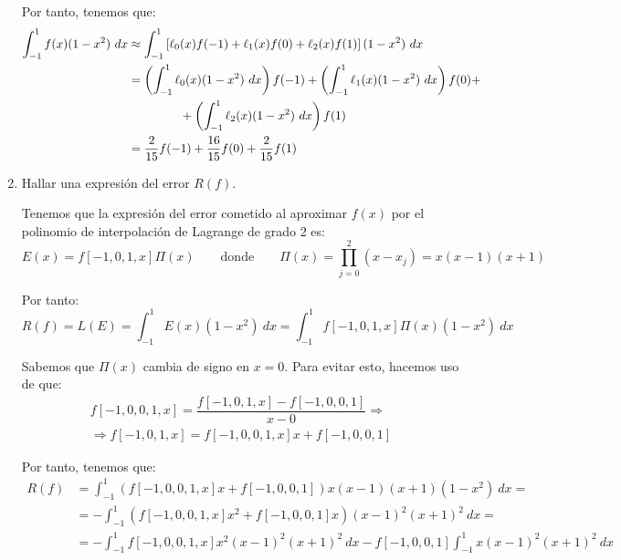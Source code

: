 \begin{ejercicio}
\begin{enumerate}
        Por tanto, tenemos que:
        \begin{align*}
            \int_{-1}^1f(x)(1-x^2)\ dx &\approx \int_{-1}^1\left[\ell_0(x)f(-1)+\ell_1(x)f(0)+\ell_2(x)f(1)\right](1-x^2)\ dx\\
            &= \left(\int_{-1}^1\ell_0(x)(1-x^2)\ dx\right)f(-1)+\left(\int_{-1}^1\ell_1(x)(1-x^2)\ dx\right)f(0)+\\&\hspace{1.5cm}+\left(\int_{-1}^1\ell_2(x)(1-x^2)\ dx\right)f(1)\\
            &= \dfrac{2}{15}f(-1)+\dfrac{16}{15}f(0)+\dfrac{2}{15}f(1)
        \end{align*}
        \item Hallar una expresión del error $R(f)$.
        
        Tenemos que la expresión del error cometido al aproximar $f(x)$ por el polinomio de interpolación de Lagrange de grado 2 es:
        \begin{equation*}
            E(x) = f[-1,0,1,x]\Pi(x)\qquad \text{donde}\qquad \Pi(x) = \prod_{j=0}^2(x-x_j)=x(x-1)(x+1)
        \end{equation*}

        Por tanto:
        \begin{equation*}
            R(f)=L(E)=\int_{-1}^1E(x)(1-x^2)\ dx = \int_{-1}^1f[-1,0,1,x]\Pi(x)(1-x^2)\ dx
        \end{equation*}

        Sabemos que $\Pi(x)$ cambia de signo en $x=0$. Para evitar esto, hacemos uso de que:
        \begin{multline*}
            f[-1, 0, 0, 1, x] = \dfrac{f[-1, 0, 1, x]-f[-1, 0, 0, 1]}{x-0}
            \Longrightarrow\\\Longrightarrow f[-1, 0, 1, x] = f[-1, 0, 0, 1, x]x + f[-1, 0, 0, 1]
        \end{multline*}

        Por tanto, tenemos que:
        \begin{align*}
            R(f) &= \int_{-1}^1\left(f[-1, 0, 0, 1, x]x + f[-1, 0, 0, 1]\right)x(x-1)(x+1)(1-x^2)\ dx
            =\\&= -\int_{-1}^1\left(f[-1, 0, 0, 1, x]x^2+f[-1, 0, 0, 1]x\right)(x-1)^2(x+1)^2\ dx
            =\\&= -\int_{-1}^1f[-1, 0, 0, 1, x]x^2(x-1)^2(x+1)^2\ dx - f[-1, 0, 0, 1]\int_{-1}^1x(x-1)^2(x+1)^2\ dx
        \end{align*}


\end{enumerate}
\end{ejercicio}
